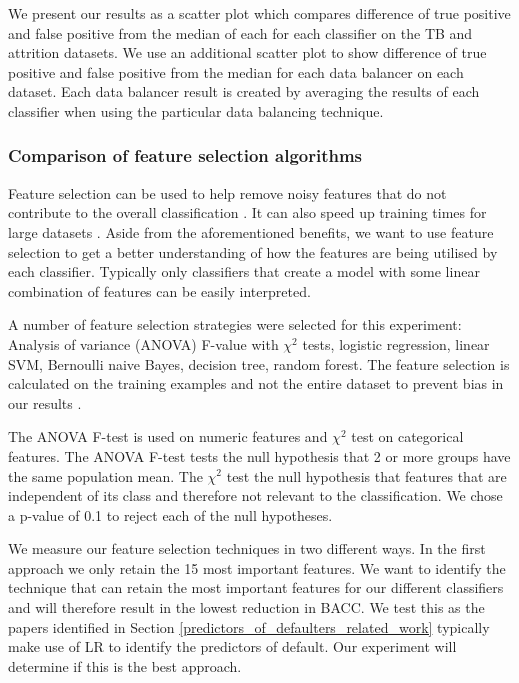 \documentclass{sig-alternate-05-2015}
\begin{document}
	We present our results as a scatter plot which compares difference of true positive and false positive from the median of each for each classifier on the TB and attrition datasets. We use an additional scatter plot to show difference of true positive and false positive from the median for each data balancer on each dataset. Each data balancer result is created by averaging the results of each classifier when using the particular data balancing technique.
	
	\subsubsection{Comparison of feature selection algorithms}
	Feature selection can be used to help remove noisy features that do not contribute to the overall classification \cite{Guyon:2003:IVF:944919.944968}. It can also speed up training times for large datasets \cite{Guyon:2003:IVF:944919.944968}. Aside from the aforementioned benefits, we want to use feature selection to get a better understanding of how the features are being utilised by each classifier. Typically only classifiers that create a model with some linear combination of features can be easily interpreted.
	
	A number of feature selection strategies were selected for this experiment: Analysis of variance (ANOVA) F-value with $\chi^2$ tests, logistic regression, linear SVM, Bernoulli naive Bayes, decision tree, random forest. The feature selection is calculated on the training examples and not the entire dataset to prevent bias in our results \cite{PMID:25988841}.
	
	The ANOVA F-test is used on numeric features and $\chi^2$ test on categorical features. The ANOVA F-test tests the null hypothesis that 2 or more groups have the same population mean. The $\chi^2$ test the null hypothesis that features that are independent of its class and therefore not relevant to the classification. We chose a p-value of 0.1 to reject each of the null hypotheses. 
	
	We measure our feature selection techniques in two different ways. In the first approach we only retain the 15 most important features. We want to identify the technique that can retain the most important features for our different classifiers and will therefore result in the lowest reduction in BACC. We test this as the papers identified in Section \ref{predictors_of_defaulters_related_work} typically make use of LR to identify the predictors of default. Our experiment will determine if this is the best approach.
	
\end{document}
